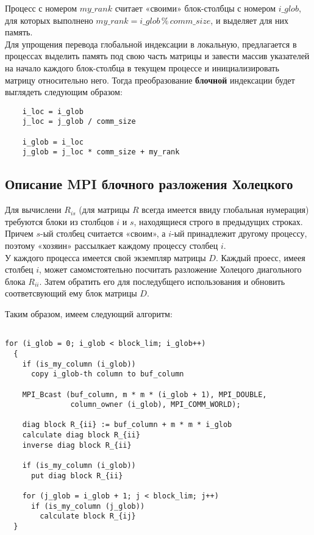 \documentclass[a4paper,12pt]{article}
\begin{document}
    Процесс с номером $my\_rank$ считает «своими» блок-столбцы с номером $i\_glob$, 
    для которых выполнено $my\_rank = i\_glob \,\%\, comm\_size$,
    и выделяет для них память.\\
    
    Для упрощения перевода глобальной индексации в локальную, предлагается в процессах
    выделить память под свою часть матрицы и завести массив указателей на начало каждого 
    блок-столбца в текущем процессе и инициализировать матрицу относительно него. 
    Тогда преобразование \textbf{блочной} индексации будет выглядеть следующим образом:
    \begin{verbatim}
    i_loc = i_glob
    j_loc = j_glob / comm_size
    
    i_glob = i_loc
    j_glob = j_loc * comm_size + my_rank
    \end{verbatim}
    
    
\subsection{Описание MPI блочного разложения Холецкого}
    Для вычислени $R_{is}$ (для матрицы $R$ всегда имеется ввиду глобальная нумерация) 
    требуются блоки из столбцов $i$ и $s$, находящиеся строго в предыдущих строках. 
    Причем $s$-ый столбец считается «своим», а $i$-ый принадлежит 
    другому процессу, поэтому «хозяин» рассылкает каждому процессу столбец $i$. \\
    
    У каждого процесса имеется свой экземпляр матрицы $D$.
    Каждый проесс, имеея столбец $i$, может самомстоятельно посчитать разложение Холецого диагольного 
    блока $R_{ii}$. Затем обратить его для последубщего использования и обновить соответсвующий ему блок матрицы $D$.
    
    Таким образом, имеем 
    \hypertarget{mpi_alg}{следующий алгоритм}: 

\begin{verbatim}

for (i_glob = 0; i_glob < block_lim; i_glob++)
  {
    if (is_my_column (i_glob))
      copy i_glob-th column to buf_column
    
    MPI_Bcast (buf_column, m * m * (i_glob + 1), MPI_DOUBLE, 
               column_owner (i_glob), MPI_COMM_WORLD);

    diag block R_{ii} := buf_column + m * m * i_glob
    calculate diag block R_{ii}
    inverse diag block R_{ii}

    if (is_my_column (i_glob))
      put diag block R_{ii}
        
    for (j_glob = i_glob + 1; j < block_lim; j++)
      if (is_my_column (j_glob))
        calculate block R_{ij}
  }
\end{verbatim}
\end{document}
